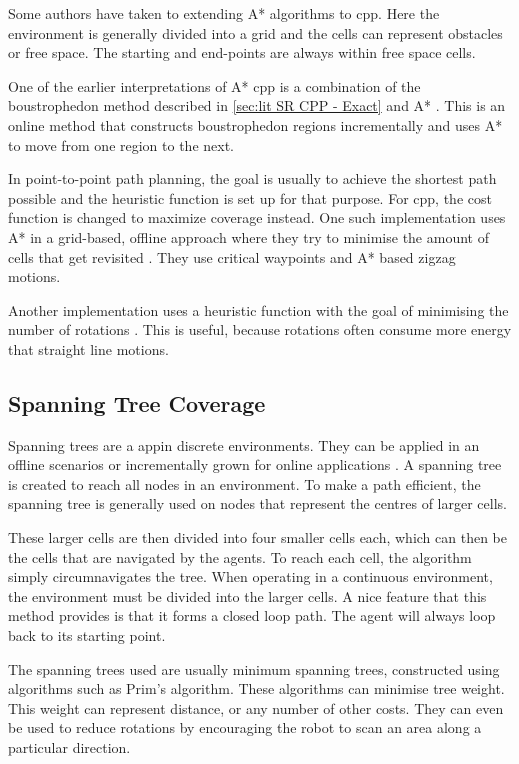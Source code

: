Some authors have taken to extending A* algorithms to \ac{cpp}. Here the environment is generally divided into a grid and the cells can represent obstacles or free space. The starting and end-points are always within free space cells.

One of the earlier interpretations of A* \ac{cpp} is a combination of the boustrophedon method described in \ref{sec:lit SR CPP - Exact} and A* \cite{Viet2012}. This is an online method that constructs boustrophedon regions incrementally and uses A* to move from one region to the next. 

In point-to-point path planning, the goal is usually to achieve the shortest path possible and the heuristic function is set up for that purpose. For \ac{cpp}, the cost function is changed to maximize coverage instead. One such implementation uses A* in a grid-based, offline approach where they try to minimise the amount of cells that get revisited \cite{Le2018}. They use critical waypoints and A* based zigzag motions. 

Another implementation uses a heuristic function with the goal of minimising the number of rotations \cite{Dogru2017}. This is useful, because rotations often consume more energy that straight line motions.
\subsection{Spanning Tree Coverage}
\label{sec:lit SR CPP - STC}
Spanning trees are a appin discrete environments. They can be applied in an offline scenarios or incrementally grown for online applications \cite{Gabriely2001}. A spanning tree is created to reach all nodes in an environment. To make a path efficient, the spanning tree is generally used on nodes that represent the centres of larger cells. 

These larger cells are then divided into four smaller cells each, which can then be the cells that are navigated by the agents. To reach each cell, the algorithm simply circumnavigates the tree. When operating in a continuous environment, the environment must be divided into the larger cells. A nice feature that this method provides is that it forms a closed loop path. The agent will always loop back to its starting point. \cite{Hazon2005} 

The spanning trees used are usually minimum spanning trees, constructed using algorithms such as Prim's algorithm. These algorithms can minimise tree weight. This weight can represent distance, or any number of other costs. They can even be used to reduce rotations by encouraging the robot to scan an area along a particular direction. \cite{Gabriely2001}
